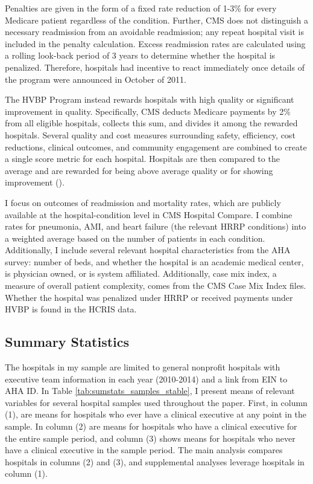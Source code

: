 \documentclass[12pt]{article}
\begin{document}
    Penalties are given in the form of a fixed rate reduction of 1-3\% for every Medicare patient regardless of the condition. Further, CMS does not distinguish a necessary readmission from an avoidable readmission; any repeat hospital visit is included in the penalty calculation. Excess readmission rates are calculated using a rolling look-back period of 3 years to determine whether the hospital is penalized. Therefore, hospitals had incentive to react immediately once details of the program were announced in October of 2011. 

    The HVBP Program instead rewards hospitals with high quality or significant improvement in quality. Specifically, CMS deducts Medicare payments by 2\% from all eligible hospitals, collects this sum, and divides it among the rewarded hospitals. Several quality and cost measures surrounding safety, efficiency, cost reductions, clinical outcomes, and community engagement are combined to create a single score metric for each hospital. Hospitals are then compared to the average and are rewarded for being above average quality or for showing improvement (\cite{CMS_2023}). 

    I focus on outcomes of readmission and mortality rates, which are publicly available at the hospital-condition level in CMS Hospital Compare. I combine rates for pneumonia, AMI, and heart failure (the relevant HRRP conditions) into a weighted average based on the number of patients in each condition. Additionally, I include several relevant hospital characteristics from the AHA survey: number of beds, and whether the hospital is an academic medical center, is physician owned, or is system affiliated. Additionally, case mix index, a measure of overall patient complexity, comes from the CMS Case Mix Index files. Whether the hospital was penalized under HRRP or received payments under HVBP is found in the HCRIS data. 

	\subsection{Summary Statistics}\label{sec:data}

    The hospitals in my sample are limited to general nonprofit hospitals with executive team information in each year (2010-2014) and a link from EIN to AHA ID. In Table \ref{tab:sumstats_samples_stable}, I present means of relevant variables for several hospital samples used throughout the paper. First, in column (1), are means for hospitals who ever have a clinical executive at any point in the sample. In column (2) are means for hospitals who have a clinical executive for the entire sample period, and column (3) shows means for hospitals who never have a clinical executive in the sample period. The main analysis compares hospitals in columns (2) and (3), and supplemental analyses leverage hospitals in column (1). 
\end{document}
